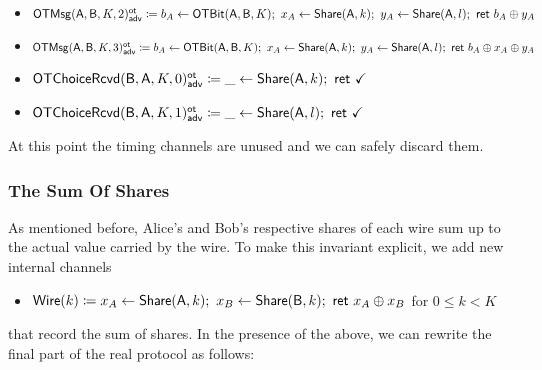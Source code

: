\begin{itemize}
\begin{itemize}
\item {\color{blue} $\mathsf{OTMsg}(\mathsf{A},\mathsf{B},K,2)^{\mathsf{ot}}_{\mathsf{adv}} \coloneqq b_A \leftarrow \mathsf{OTBit}(\mathsf{A},\mathsf{B},K); \ x_A \leftarrow \mathsf{Share}(\mathsf{A},k); \ y_A \leftarrow \mathsf{Share}(\mathsf{A},l); \ \mathsf{ret} \ b_A \oplus y_A$}
\item {\color{blue} $\mathsf{OTMsg}(\mathsf{A},\mathsf{B},K,3)^{\mathsf{ot}}_{\mathsf{adv}} \coloneqq b_A \leftarrow \mathsf{OTBit}(\mathsf{A},\mathsf{B},K); \ x_A \leftarrow \mathsf{Share}(\mathsf{A},k); \ y_A \leftarrow \mathsf{Share}(\mathsf{A},l); \ \mathsf{ret} \ b_A \oplus x_A \oplus y_A$}\medskip
\item {\color{red} $\mathsf{OTChoiceRcvd}(\mathsf{B},\mathsf{A},K,0)^{\mathsf{ot}}_{\mathsf{adv}} \coloneqq \_ \leftarrow \mathsf{Share}(\mathsf{A},k); \ \mathsf{ret} \ \checkmark$}
\item {\color{red} $\mathsf{OTChoiceRcvd}(\mathsf{B},\mathsf{A},K,1)^{\mathsf{ot}}_{\mathsf{adv}} \coloneqq \_ \leftarrow \mathsf{Share}(\mathsf{A},l); \ \mathsf{ret} \ \checkmark$}
\end{itemize}
\end{itemize}

\noindent At this point the timing channels are unused and we can safely discard them.

\subsubsection{The Sum Of Shares}
As mentioned before, Alice's and Bob's respective shares of each wire sum up to the actual value carried by the wire. To make this invariant explicit, we add new internal channels
\begin{itemize}
\item $\mathsf{Wire}(k) \coloneqq x_A \leftarrow \mathsf{Share}(\mathsf{A},k); \ x_B \leftarrow \mathsf{Share}(\mathsf{B},k); \ \mathsf{ret} \ x_A \oplus x_B$ for $0 \leq k < K$
\end{itemize}
that record the sum of shares. In the presence of the above, we can rewrite the final part of the real protocol as follows:


